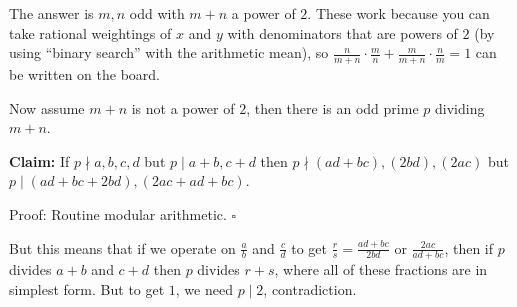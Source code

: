 The answer is $m,n$ odd with $m+n$ a power of $2$. These work because you can take rational weightings of $x$ and $y$ with denominators that are powers of $2$ (by using ``binary search'' with the arithmetic mean), so $\frac{n}{m+n}\cdot\frac{m}{n}+\frac{m}{m+n}\cdot\frac{n}{m}=1$ can be written on the board.

Now assume $m+n$ is not a power of $2$, then there is an odd prime $p$ dividing $m+n$.

\textbf{Claim:} If $p\nmid a,b,c,d$ but $p\mid a+b,c+d$ then $p\nmid (ad+bc),(2bd),(2ac)$ but $p\mid (ad+bc+2bd),(2ac+ad+bc)$.

Proof: Routine modular arithmetic. $\square$

But this means that if we operate on $\frac{a}{b}$ and $\frac{c}{d}$ to get $\frac{r}{s}=\frac{ad+bc}{2bd}$ or $\frac{2ac}{ad+bc}$, then if $p$ divides $a+b$ and $c+d$ then $p$ divides $r+s$, where all of these fractions are in simplest form. But to get $1$, we need $p\mid2$, contradiction.